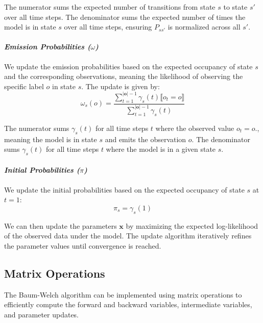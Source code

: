 The numerator sums the expected number of transitions from state $s$ to state $s'$ over all time steps.
The denominator sums the expected number of times the model is in state $s$ over all time steps, ensuring $P_{ss'}$ is normalized across all $s'$.

\paragraph*{\textit{Emission Probabilities ($\omega$)}}

We update the emission probabilities based on the expected occupancy of state $s$ and the corresponding observations, meaning the likelihood of observing the specific label $o$ in state $s$. 
The update is given by:
\begin{equation}
    \omega_s(o) = \frac{\sum_{t = 1}^{|\mathbf{o}|-1} \gamma_s(t) \lBrack o_t = o \rBrack}{\sum_{t = 1}^{|\mathbf{o}|-1} \gamma_s(t)}
    \label{eq:omega}
\end{equation}

The numerator sums $\gamma_s(t)$ for all time steps $t$ where the observed value $o_t = o$., meaning the model is in state $s$ and emits the observation $o$.
The denominator sums $\gamma_s(t)$ for all time steps $t$ where the model is in a given state $s$.


\paragraph*{\textit{Initial Probabilities ($\pi$)}}

We update the initial probabilities based on the expected occupancy of state $s$ at $t = 1$:
\begin{equation}
    \pi_s = \gamma_s(1)
    \label{eq:initial-probabilities}
\end{equation}

We can then update the parameters $\mathbf{x}$ by maximizing the expected log-likelihood of the observed data under the model.
The update algorithm iteratively refines the parameter values until convergence is reached.

\subsection{Matrix Operations}\label{subsec:matrix-operations}
The Baum-Welch algorithm can be implemented using matrix operations to efficiently compute the forward and backward variables, intermediate variables, and parameter updates.

